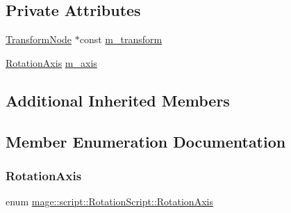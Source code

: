 \subsection*{Private Attributes}
\begin{DoxyCompactItemize}
\item 
\hyperlink{classmage_1_1_transform_node}{Transform\+Node} $\ast$const \hyperlink{classmage_1_1script_1_1_rotation_script_a6dd0624548f5cd64db3974351337a338}{m\+\_\+transform}
\item 
\hyperlink{classmage_1_1script_1_1_rotation_script_aa8a91cc8c771fc777ffb5e8a28c43ad2}{Rotation\+Axis} \hyperlink{classmage_1_1script_1_1_rotation_script_a334c42c3ca6af6c2713c98ba4151cdbb}{m\+\_\+axis}
\end{DoxyCompactItemize}
\subsection*{Additional Inherited Members}


\subsection{Member Enumeration Documentation}
\hypertarget{classmage_1_1script_1_1_rotation_script_aa8a91cc8c771fc777ffb5e8a28c43ad2}{}\label{classmage_1_1script_1_1_rotation_script_aa8a91cc8c771fc777ffb5e8a28c43ad2} 
\subsubsection{\texorpdfstring{Rotation\+Axis}{RotationAxis}}
{\footnotesize\ttfamily enum \hyperlink{classmage_1_1script_1_1_rotation_script_aa8a91cc8c771fc777ffb5e8a28c43ad2}{mage\+::script\+::\+Rotation\+Script\+::\+Rotation\+Axis}\hspace{0.3cm}{\ttfamily [strong]}}

